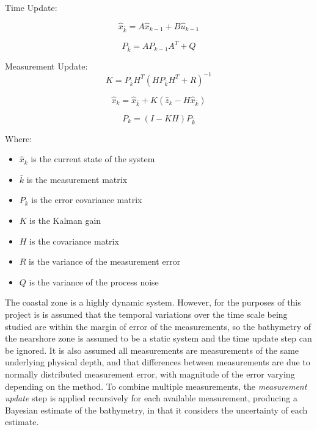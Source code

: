 Time Update:

\begin{equation}
    \hat{x}_{\bar{k}} = A\hat{x}_{k-1} + B\hat{u}_{k-1}
\end{equation}

\begin{equation}
    P_{\bar{k}} = A P_{k-1} A^T + Q
\end{equation}

Measurement Update:
\begin{equation}\label{eq:kalmangain}
    K = P_{\bar{k}} H^T(H P_{\bar{k}} H^T + R) ^{-1}
\end{equation}

\begin{equation}\label{eq:new_state_measurement}
    \hat{x}_k = \hat{x}_{\bar{k}} + K(\hat{z}_k - H \hat{x}_{\bar{k}})
\end{equation}

\begin{equation}\label{eq:new_uncertainty}
    P_k = (I - KH)P_{\bar{k}}
\end{equation}

Where:
\begin{itemize}
    \item $\hat{x}_k$ is the current state of the system
    \item $\bar{k}$ is the measurement matrix
    \item $P_k$ is the error covariance matrix
    \item $K$ is the Kalman gain
    \item $H$ is the covariance matrix
    \item $R$ is the variance of the measurement error
    \item $Q$ is the variance of the process noise
\end{itemize}

The coastal zone is a highly dynamic system. However, for the purposes of this project is is assumed that the temporal variations over the time scale being studied are within the margin of error of the measurements, so the bathymetry of the nearshore zone is assumed to be a static system and the time update step can be ignored. It is also assumed all measurements are measurements of the same underlying physical depth, and that differences between measurements are due to normally distributed measurement error, with magnitude of the error varying depending on the method. To combine multiple measurements, the \emph{measurement update} step is applied recursively for each available measurement, producing a Bayesian estimate of the bathymetry, in that it considers the uncertainty of each estimate. 

